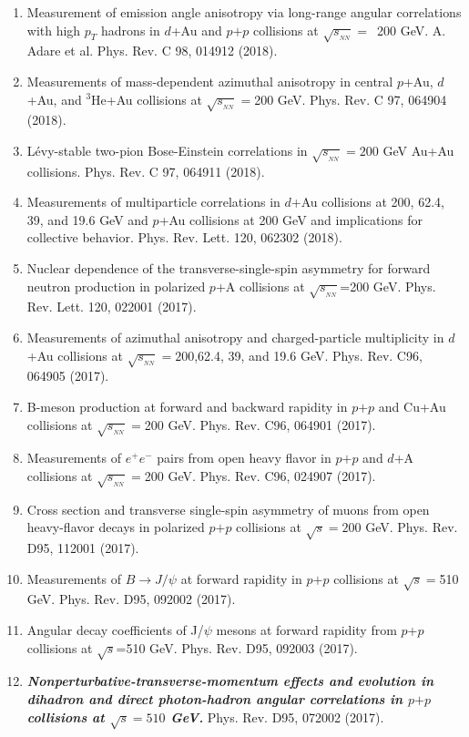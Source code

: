 \documentclass[11pt]{article}
\newcommand{\snn}{\sqrt{s_{_{NN}}}}
\begin{document}
\begin{flushleft}
\begin{center}
\begin{enumerate}
		\item Measurement of emission angle anisotropy via long-range angular correlations with high $p_T$ hadrons in $d$+Au and $p$$+$$p$ collisions at $\sqrt{s_{_{NN}}}=$~200 GeV. A. Adare et al. Phys. Rev. C 98, 014912 (2018).
		\item Measurements of mass-dependent azimuthal anisotropy in central $p$+Au, $d$+Au, and $^3$He+Au collisions at $\sqrt{s_{_{NN}}}=$200 GeV. Phys. Rev. C 97, 064904 (2018).
		\item L\'evy-stable two-pion Bose-Einstein correlations in $\sqrt{s_{_{NN}}}=200$ GeV Au+Au collisions. Phys. Rev. C 97, 064911 (2018).
		\item Measurements of multiparticle correlations in $d$+Au collisions at 200, 62.4, 39, and 19.6 GeV and $p$+Au collisions at 200 GeV and implications for collective behavior. Phys. Rev. Lett. 120, 062302 (2018).
		\item Nuclear dependence of the transverse-single-spin asymmetry for forward neutron production in polarized $p$+A collisions at $\snn$=200 GeV. Phys. Rev. Lett. 120, 022001 (2017).
		\item Measurements of azimuthal anisotropy and charged-particle multiplicity in $d$+Au collisions at $\sqrt{s_{_{NN}}}=200$,62.4, 39, and 19.6 GeV. Phys. Rev. C96, 064905 (2017).
		\item B-meson production at forward and backward rapidity in $p$$+$$p$ and Cu+Au collisions at $\sqrt{s_{_{NN}}}=$200 GeV. Phys. Rev. C96, 064901 (2017).
		\item Measurements of $e^+e^-$ pairs from open heavy flavor in $p$$+$$p$ and $d$+A collisions at $\sqrt{s_{_{NN}}}=$200 GeV. Phys. Rev. C96, 024907 (2017).
		\item Cross section and transverse single-spin asymmetry of muons from open heavy-flavor decays in polarized $p$$+$$p$ collisions at $\sqrt{s}=200$ GeV. Phys. Rev. D95, 112001 (2017).
		\item Measurements of $B\rightarrow J/\psi$ at forward rapidity in $p$$+$$p$ collisions at $\sqrt{s}=$510 GeV. Phys. Rev. D95, 092002 (2017).
	
		\item Angular decay coefficients of J/$\psi$ mesons at forward rapidity from $p$+$p$ collisions at $\sqrt{s}$=510 GeV. Phys. Rev. D95, 092003 (2017).
	
		\item \textbf{\textit{Nonperturbative-transverse-momentum effects and evolution in dihadron and direct photon-hadron angular correlations in $p$$+$$p$ collisions at $\sqrt{s}=510$ GeV.}} Phys. Rev. D95, 072002 (2017).
		

\end{enumerate}
\end{center}
\end{flushleft}
\end{document}
